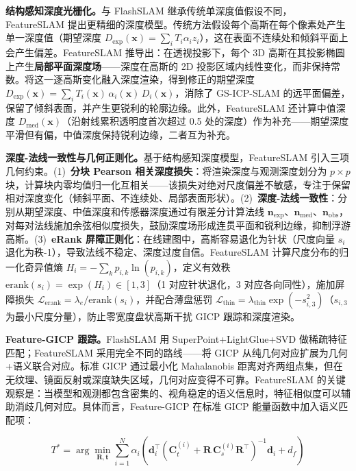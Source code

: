 \textbf{结构感知深度光栅化。}与 FlashSLAM 继承传统单深度值假设不同，FeatureSLAM 提出更精细的深度模型。传统方法假设每个高斯在每个像素处产生单一深度值（期望深度 $D_\text{exp}(\mathbf{x}) = \sum_i T_i \alpha_i z_i$），这在表面不连续处和倾斜平面上会产生偏差。FeatureSLAM 推导出：在透视投影下，每个 3D 高斯在其投影椭圆上产生\textbf{局部平面深度场}——深度在高斯的 2D 投影区域内线性变化，而非保持常数。将这一逐高斯变化融入深度渲染，得到修正的期望深度 $D_\text{exp}(\mathbf{x}) = \sum_i T_i(\mathbf{x})\,\alpha_i(\mathbf{x})\,D_i(\mathbf{x})$，消除了 GS-ICP-SLAM 的远平面偏差，保留了倾斜表面，并产生更锐利的轮廓边缘。此外，FeatureSLAM 还计算中值深度 $D_\text{med}(\mathbf{x})$（沿射线累积透明度首次超过 0.5 处的深度）作为补充——期望深度平滑但有偏，中值深度保持锐利边缘，二者互为补充。

\textbf{深度-法线一致性与几何正则化。}基于结构感知深度模型，FeatureSLAM 引入三项几何约束。(1)~\textbf{分块 Pearson 相关深度损失}：将渲染深度与观测深度划分为 $p{\times}p$ 块，计算块内零均值归一化互相关——该损失对绝对尺度偏差不敏感，专注于保留相对深度变化（倾斜平面、不连续处、局部表面形状）。(2)~\textbf{深度-法线一致性}：分别从期望深度、中值深度和传感器深度通过有限差分计算法线 $\mathbf{n}_\text{exp}$、$\mathbf{n}_\text{med}$、$\mathbf{n}_\text{obs}$，对每对法线施加余弦相似度损失，鼓励深度场形成连贯平面和锐利边缘，抑制浮游高斯。(3)~\textbf{eRank 屏障正则化}：在线建图中，高斯容易退化为针状（尺度向量 $s_i$ 退化为秩-1），导致法线不稳定、深度过度自信。FeatureSLAM 计算尺度分布的归一化奇异值熵 $H_i = -\sum_k p_{i,k}\ln(p_{i,k})$，定义有效秩 $\text{erank}(s_i) = \exp(H_i) \in [1,3]$（1 对应针状退化，3 对应各向同性），施加屏障损失 $\mathcal{L}_\text{erank} = \lambda_e / \text{erank}(s_i)$，并配合薄盘惩罚 $\mathcal{L}_\text{thin} = \lambda_\text{thin} \exp(-s_{i,3}^2)$（$s_{i,3}$ 为最小尺度分量），防止零宽度盘状高斯干扰 GICP 跟踪和深度渲染。

\textbf{Feature-GICP 跟踪。}FlashSLAM 用 SuperPoint+LightGlue+SVD 做稀疏特征匹配；FeatureSLAM 采用完全不同的路线——将 GICP 从纯几何对应扩展为几何+语义联合对应。标准 GICP 通过最小化 Mahalanobis 距离对齐两组点集，但在无纹理、镜面反射或深度缺失区域，几何对应变得不可靠。FeatureSLAM 的关键观察是：当模型和观测都包含密集的、视角稳定的语义信息时，特征相似度可以辅助消歧几何对应。具体而言，Feature-GICP 在标准 GICP 能量函数中加入语义匹配项：

\begin{equation}
    T^* = \arg\min_{\mathbf{R}, \mathbf{t}} \sum_{i=1}^{N} \alpha_i \left( \mathbf{d}_i^\top \left( \mathbf{C}_t^{(i)} + \mathbf{R}\,\mathbf{C}_s^{(i)}\mathbf{R}^\top \right)^{-1} \mathbf{d}_i + d_f \right)
\end{equation}

